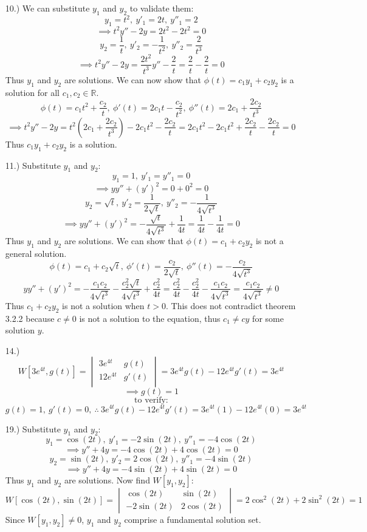 \documentclass[12pt]{article}
\newcommand{\bracks}[1]{\left[#1\right]}
\newcommand{\parns}[1]{\left(#1\right)}
\begin{document}
\pagestyle{fancy}
\fancyhead{}

\normalsize
\begin{itemize}
    \item[10.)] We can substitute $y_1$ and $y_2$ to validate them:
    \[y_1=t^2,\ y'_1=2t,\ y''_1=2 \]
    \[\implies t^2y''-2y=2t^2-2t^2=0\]
    \[y_2=\frac{1}{t},\ y'_2=-\frac{1}{t^2},\ y''_2=\frac{2}{t^3}\]
    \[\implies t^2y''-2y=\frac{2t^2}{t^3}y''-\frac{2}{t}=\frac{2}{t}-\frac{2}{t}=0\]
    Thus $y_1$ and $y_2$ are solutions. We can now show that $\phi(t)=c_1y_1+c_2y_2$ is a solution for all $c_1,c_2\in\mathbb{R}$.
    \[\phi(t)=c_1t^2+\frac{c_2}{t},\ \phi'(t)=2c_1t-\frac{c_2}{t^2},\ \phi''(t)=2c_1+\frac{2c_2}{t^3}\]
    \[\implies t^2y''-2y=t^2\parns{2c_1+\frac{2c_2}{t^3}}-2c_1t^2-\frac{2c_2}{t}=2c_1t^2-2c_1t^2+\frac{2c_2}{t}-\frac{2c_2}{t}=0\]
    Thus $c_1y_1+c_2y_2$ is a solution.

    \item[11.)] Substitute $y_1$ and $y_2$:
    \[y_1=1,\ y'_1=y''_1=0\]
    \[\implies yy''+(y')^2=0+0^2=0\]
    \[y_2=\sqrt{t},\ y'_2=\frac{1}{2\sqrt{t}},\ y''_2=-\frac{1}{4\sqrt{t^3}}\]
    \[\implies yy''+(y')^2=-\frac{\sqrt{t}}{4\sqrt{t^3}}+\frac{1}{4t}=\frac{1}{4t}-\frac{1}{4t}=0\]
    Thus $y_1$ and $y_2$ are solutions. We can show that $\phi(t)=c_1+c_2y_2$ is not a general solution.
    \[\phi(t)=c_1+c_2\sqrt{t},\ \phi'(t)=\frac{c_2}{2\sqrt{t}},\ \phi''(t)=-\frac{c_2}{4\sqrt{t^3}}\]
    \[yy''+(y')^2=-\frac{c_1c_2}{4\sqrt{t^3}}-\frac{c_2^2\sqrt{t}}{4\sqrt{t^3}}+\frac{c^2_2}{4t}=\frac{c_2^2}{4t}-\frac{c_2^2}{4t}-\frac{c_1c_2}{4\sqrt{t^3}}=\frac{c_1c_2}{4\sqrt{t^3}}\neq0\]
    Thus $c_1+c_2y_2$ is not a solution when $t>0$. This does not contradict theorem 3.2.2 because $c\neq0$ is not a solution to the equation, thus $c_1\neq cy$ for some solution $y$.

    \item[14.)] \[W\bracks{3e^{4t},g(t)}=\begin{vmatrix}
        3e^{4t} & g(t) \\
        12e^{4t} & g'(t) \\
    \end{vmatrix}=3e^{4t}g(t)-12e^{4t}g'(t)=3e^{4t}\]
    \[\implies g(t)=1\]
    \[\text{to verify:}\]
    \[g(t)=1,\ g'(t)=0,\ \therefore\ 3e^{4t}g(t)-12e^{4t}g'(t)=3e^{4t}(1)-12e^{4t}(0)=3e^{4t}\]

    \item[19.)] Substitute $y_1$ and $y_2$:
    \[y_1=\cos(2t),\ y'_1=-2\sin(2t),\ y''_1=-4\cos(2t)\]
    \[\implies y''+4y=-4\cos(2t)+4\cos(2t)=0\]
    \[y_2=\sin(2t),\ y'_2=2\cos(2t),\ y''_1=-4\sin(2t)\]
    \[\implies y''+4y=-4\sin(2t)+4\sin(2t)=0\]
    Thus $y_1$ and $y_2$ are solutions. Now find $W\bracks{y_1,y_2}$:
    \[W\bracks{\cos(2t),\sin(2t)}=\begin{vmatrix}
        \cos(2t) & \sin(2t) \\
        -2\sin(2t) & 2\cos(2t)
    \end{vmatrix}=2\cos^2(2t)+2\sin^2(2t)=1\]
    Since $W\bracks{y_1,y_2}\neq0$, $y_1$ and $y_2$ comprise a fundamental solution set.


\end{itemize}
\end{document}
